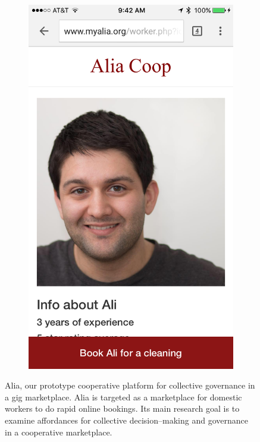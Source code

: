 \documentclass[11pt]{article}
\begin{document}
\begin{figure}
\begin{subfigure}[b]{0.3\textwidth}
        \includegraphics[width=\textwidth]{figures/3.png}
        \label{fig:profile}
    \end{subfigure}
    \caption{Alia, our prototype cooperative platform for collective governance in a gig marketplace.
             Alia is targeted as a marketplace for domestic workers to do rapid online bookings.
             Its main research goal is to examine affordances for
             collective decision--making and
             governance in a cooperative marketplace.}\label{fig:Alia}
\end{figure}
\end{document}
